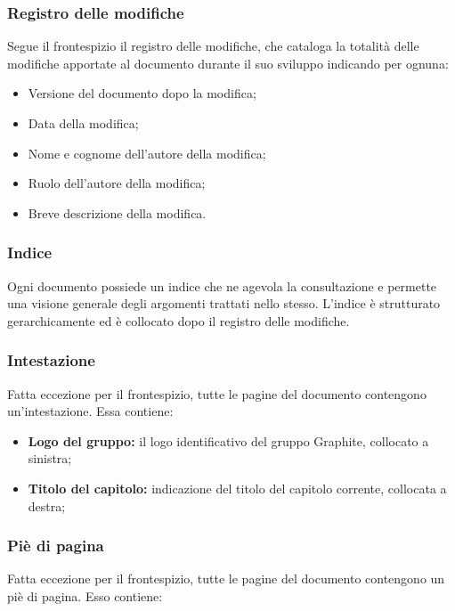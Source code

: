 \documentclass[../NormediProgetto.tex]{subfiles}
\begin{document}
\subsubsection{Registro delle modifiche}

Segue il frontespizio il registro delle modifiche, che cataloga la totalità delle modifiche apportate al documento durante il suo sviluppo indicando per ognuna:

\begin{itemize}
    \item Versione del documento dopo la modifica;
    \item Data della modifica;
    \item Nome e cognome dell'autore della modifica;
    \item Ruolo dell'autore della modifica;
    \item Breve descrizione della modifica.
\end{itemize}

\subsubsection{Indice}

Ogni documento possiede un indice che ne agevola la consultazione e permette una visione generale degli argomenti trattati nello stesso. L'indice è strutturato gerarchicamente ed è collocato dopo il registro delle modifiche.

\subsubsection{Intestazione}

Fatta eccezione per il frontespizio, tutte le pagine del documento contengono un’intestazione. Essa contiene: 

\begin{itemize}
    \item \textbf{Logo del gruppo:} il logo identificativo del gruppo Graphite, collocato a sinistra;
    \item \textbf{Titolo del capitolo:} indicazione del titolo del capitolo corrente, collocata a destra;
\end{itemize}

\subsubsection{Piè di pagina}

Fatta eccezione per il frontespizio, tutte le pagine del documento contengono un piè di pagina. Esso contiene: 
\end{document}
